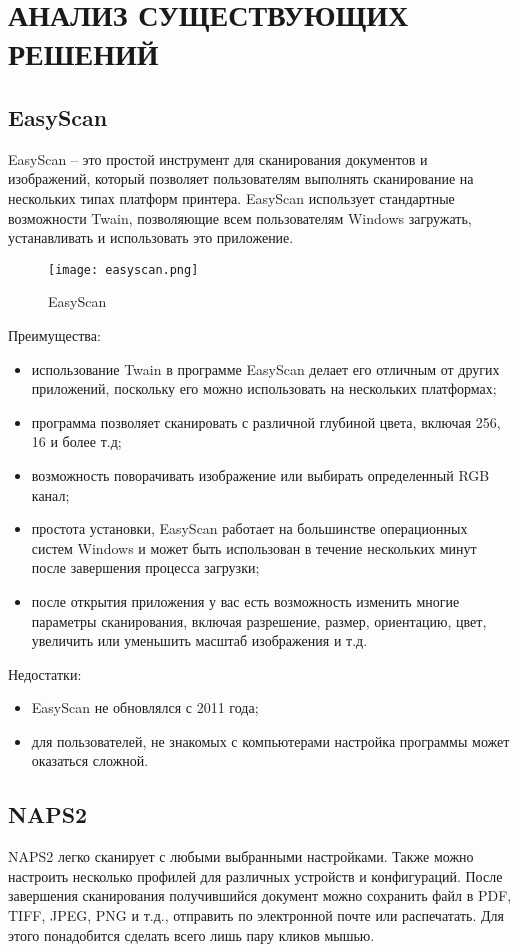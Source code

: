 \section{АНАЛИЗ СУЩЕСТВУЮЩИХ РЕШЕНИЙ}
\label{sec:solution}

\subsection{EasyScan}
EasyScan – это простой инструмент для сканирования документов и изображений, который позволяет пользователям выполнять сканирование на нескольких типах платформ принтера. EasyScan использует стандартные возможности Twain, позволяющие всем пользователям Windows загружать, устанавливать и использовать это приложение. 

\begin{figure}[h!]
	\centering
	\texttt{[image: easyscan.png]}
	\caption{EasyScan}
\end{figure}

Преимущества:
\begin{itemize}
	\item использование Twain в программе EasyScan делает его отличным от других приложений, поскольку его можно использовать на нескольких платформах;
	\item программа позволяет сканировать с различной глубиной цвета, включая 256, 16 и более т.д; 
	\item возможность поворачивать изображение или выбирать определенный RGB канал; 
	\item простота установки, EasyScan работает на большинстве операционных систем Windows и может быть использован в течение нескольких минут после завершения процесса загрузки; 
	\item после открытия приложения у вас есть возможность изменить многие параметры сканирования, включая разрешение, размер, ориентацию, цвет, увеличить или уменьшить масштаб изображения и т.д.
\end{itemize}

Недостатки:
\begin{itemize}
	\item EasyScan не обновлялся с 2011 года;
	\item для пользователей, не знакомых с компьютерами настройка программы может оказаться сложной.
\end{itemize}

\subsection{NAPS2} 
NAPS2 легко сканирует с любыми выбранными настройками. Также можно настроить несколько профилей для различных устройств и конфигураций. После завершения сканирования получившийся документ можно сохранить файл в PDF, TIFF, JPEG, PNG и т.д., отправить по электронной почте или распечатать. Для этого понадобится сделать всего лишь пару кликов мышью.


